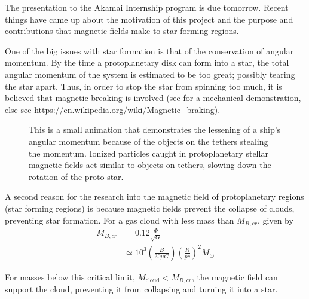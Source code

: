 \documentclass[twocolumn]{article}
\begin{document}
The presentation to the Akamai Internship program is due tomorrow. Recent things have came up about the motivation of this project and the purpose and contributions that magnetic fields make to star forming regions.

One of the big issues with star formation is that of the conservation of angular momentum. By the time a protoplanetary disk can form into a star, the total angular momentum of the system is estimated to be too great; possibly tearing the star apart. Thus, in order to stop the star from spinning too much, it is believed that magnetic breaking is involved (see  for a mechanical demonstration, else see \url{https://en.wikipedia.org/wiki/Magnetic_braking}).

\begin{figure}
	\caption{This is a small animation that demonstrates the lessening of a ship's angular momentum because of the objects on the tethers stealing the momentum. Ionized particles caught in protoplanetary stellar magnetic fields act similar to objects on tethers, slowing down the rotation of the proto-star.}
	\label{fig:yoyo_despin_animation}
\end{figure}

A second reason for the research into the magnetic field of protoplanetary regions (star forming regions) is because magnetic fields prevent the collapse of clouds, preventing star formation. For a gas cloud with less mass than $M_{B,cr}$, given by
\begin{align*}
	M_{B,cr} &= 0.12 \frac{\Phi}{\sqrt{G}} \\ 
	& \simeq 10^3 \left( \frac{B}{30 \mu G} \right) \left( \frac{R}{pc} \right)^2 M_{\odot}
\end{align*}

For masses below this critical limit, $M_\text{cloud} < M_{B,cr}$, the magnetic field can support the cloud, preventing it from collapsing and turning it into a star. 



\printbibliography
\end{document}
